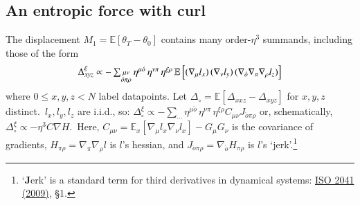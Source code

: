 \documentclass[anon,12pt]{colt2021} %
\newcommand{\squish}{\vspace{-0.05cm}}
\newcommand{\squash}{\vspace{-0.15cm}}
\newcommand{\expc}{\mathbb{E}}
\newcommand{\expct}[1]{\mathbb{E}\left[#1\right]}
\newcommand{\omicron}{{\acute{o}}}
\begin{document}
        \subsection{An entropic force with curl}\label{sect:entropic-curl}
            The displacement $M_1=\expc[\theta_T - \theta_0]$ contains many
            order-$\eta^3$ summands, including those of the form\squash
            $$
                \textstyle
                \Delta^\xi_{xyz} \propto 
                -
                \sum_{\substack{\mu\nu    \\ \omicron\pi\rho}}
                    \eta^{\mu\omicron} \, \eta^{\nu\pi} \, \eta^{\xi\rho}
                    \,
                \expct{
                    (\nabla_\mu l_x)
                    \,
                    (\nabla_\nu l_y)
                    \,
                    (\nabla_\omicron\nabla_\pi\nabla_\rho l_z)
                }
                \squash
            $$
            where $0\leq x,y,z<N$ label datapoints.
            Let $\Delta_\circ = \expc[\Delta_{xxz}-\Delta_{xyz}]$ for $x,y,z$
            distinct.\squash\  $l_x, l_y, l_z$ are i.i.d., so:
            $ 
                \Delta_\circ^\xi \propto 
                -
                \sum_{\cdots}
                \eta^{\mu\omicron} \, \eta^{\nu\pi} \, \eta^{\xi\rho}
                C_{\mu\nu} J_{\omicron\pi\rho}
            $
            or, schematically, 
                $\boxed{\Delta_\circ^\xi
                \propto -\eta^3 C\nabla H}$.\squish\ 
            Here, $C_{\mu\nu} = \expc_x[\nabla_{\mu} l_x \nabla_{\nu} l_x] - G_\mu G_\nu$ is the covariance of gradients,
            $H_{\pi\rho} = \nabla_\pi\nabla_\rho l$ is $l$'s hessian, and
            $J_{\omicron\pi\rho} = \nabla_\omicron H_{\pi\rho}$
            is $l$'s `jerk'.\footnote{
                `\textbf{J}erk' is a standard term for third derivatives in dynamical systems:
                \href{https://www.iso.org/obp/ui/\#iso:std:iso:2041:ed-3:v1:en}{ISO 2041 (2009)}, \S1.
            }
\end{document}
